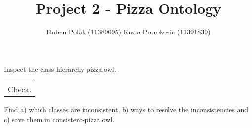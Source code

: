\documentclass[12pt]{article}
\newenvironment{problem}[2][Problem]{\begin{trivlist}
\item[\hskip \labelsep {\bfseries #1}\hskip \labelsep {\bfseries #2.}]}{\end{trivlist}}
\begin{document}
 
 
\title{Project 2 - Pizza Ontology}
\author{Ruben Polak (11389095) Krsto Prorokovic (11391839)}
\maketitle
 
\begin{problem}{0}
Inspect the class hierarchy pizza.owl. 
\end{problem}
\begin{tabular}{l}
Check.
\end{tabular}
 
\begin{problem}{1}
Find a) which classes are inconsistent, b) ways to resolve the inconsistencies and c) save them in consistent-pizza.owl.
\end{problem}
\end{document}
